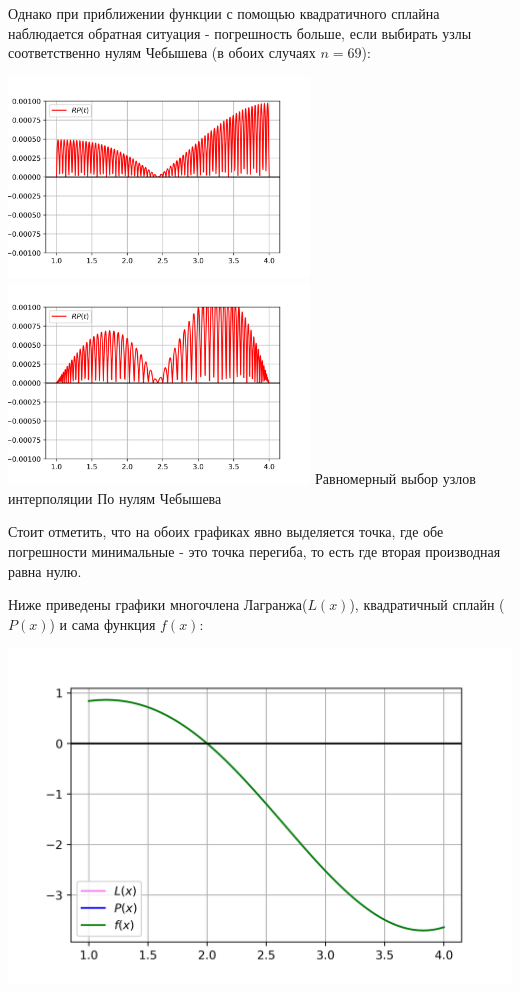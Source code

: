 Однако при приближении функции с помощью квадратичного сплайна наблюдается обратная ситуация - погрешность больше, если выбирать узлы соответственно нулям Чебышева (в обоих случаях $n = 69$):

\noindent
\includegraphics[width=8cm]{plot_4.2_err_Spline_equal.png}
\includegraphics[width=8cm]{plot_4.2_err_Spline_Chebyschev.png}
\newline
Равномерный выбор узлов интерполяции
\hspace{1cm}По нулям Чебышева

Стоит отметить, что на обоих графиках явно выделяется точка, где обе погрешности минимальные - это точка перегиба, то есть где вторая производная равна нулю.

Ниже приведены графики многочлена Лагранжа($L(x)$), квадратичный сплайн ($P(x)$) и сама функция $f(x)$:

\noindent
\includegraphics{plot_4.2_all_inter.png}

